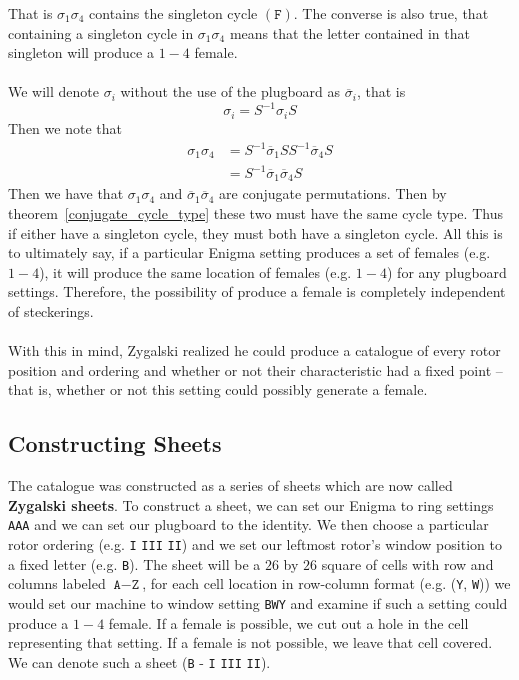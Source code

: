 That is $\sigma_1\sigma_4$ contains the singleton cycle
$(\texttt{F})$. The converse is also true, that containing a
singleton cycle in $\sigma_1\sigma_4$ means that the letter contained
in that singleton will produce a $1-4$ female.
\\\\We will denote $\sigma_i$ without the use of the plugboard as
$\overline\sigma_i$, that is
\[
	\sigma_i = S^{-1}\sigma_i S
\]
Then we note that
\begin{align*}
	\sigma_1\sigma_4 & = S^{-1}\overline\sigma_1 SS^{-1} \overline\sigma_4 S \\
	                 & = S^{-1} \overline\sigma_1\overline\sigma_4 S
\end{align*}
Then we have that $\sigma_1\sigma_4$ and
$\overline\sigma_1\overline\sigma_4$ are conjugate permutations. Then
by theorem~\ref{conjugate_cycle_type} these two must have the same
cycle type. Thus if either have a singleton cycle, they must both
have a singleton cycle. All this is to ultimately say, if  a
particular Enigma setting produces a set of females (e.g. $1-4$), it
will produce the same location of females (e.g. $1-4$) for any
plugboard settings. Therefore, the possibility of produce a female is
completely independent of steckerings.
\\\\With this in mind, Zygalski realized he could produce a catalogue
of every rotor position and ordering and whether or not their
characteristic had a fixed point -- that is, whether or not this
setting could possibly generate a female.

\subsection{Constructing Sheets}
The catalogue was constructed as a series of sheets which are now
called {\bf{Zygalski sheets}}. To construct a sheet, we can set our
Enigma to ring settings \texttt{AAA} and we can set our plugboard to
the identity. We then choose a particular rotor ordering (e.g.
\texttt{I} \texttt{III} \texttt{II}) and we set our leftmost rotor's
window position to a fixed letter (e.g. \texttt{B}). The sheet will
be a $26$ by $26$ square of cells with row and columns labeled
$\texttt{A}-\texttt{Z}$, for each cell location in row-column format
(e.g. (\texttt{Y}, \texttt{W})) we would set our machine to window
setting \texttt{BWY} and examine if such a setting could produce a
$1-4$ female. If a female is possible, we cut out a hole in the cell
representing that setting. If a female is not possible, we leave that
cell covered. We can denote such a sheet (\texttt{B} - \texttt{I}
\texttt{III} \texttt{II}).

